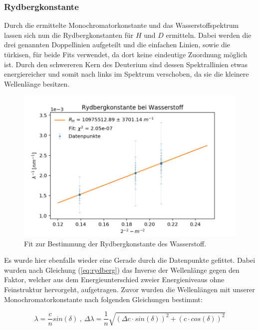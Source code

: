 \documentclass[]{article}
\begin{document}
\newpage

\subsubsection{Rydbergkonstante}
Durch die ermittelte Monochromatorkonstante und das Wasserstoffspektrum lassen sich nun die Rydbergkonstanten für $H$ und $D$ ermitteln. Dabei werden die drei genannten Doppellinien aufgeteilt und die einfachen Linien, sowie die türkisen, für beide Fits verwendet, da dort keine eindeutige Zuordnung möglich ist. Durch den schwereren Kern des Deuterium sind dessen Spektrallinien etwas energiereicher und somit nach links im Spektrum verschoben, da sie die kleinere Wellenlänge besitzen. 

\begin{figure}[H]
\centering
\includegraphics[width=1\textwidth]{Plots/R_H.png}
\caption{ Fit zur Bestimmung der Rydbergkonstante des Wasserstoff.}
\label{fig:Rydberg H}
\end{figure}

Es wurde hier ebenfalls wieder eine Gerade durch die Datenpunkte gefittet. Dabei wurden nach Gleichung (\ref{eq:rydberg}) das Inverse der Wellenlänge gegen den Faktor, welcher aus dem Energieunterschied zweier Energieniveaus ohne Feinstruktur hervorgeht, aufgetragen. Zuvor wurden die Wellenlängen mit unserer Monochromatorkonstante nach folgenden Gleichungen bestimmt:

\begin{equation}
\lambda = \frac{c}{n} sin(\delta) \:,\: \Delta\lambda = \frac{1}{n} \sqrt{(\Delta c \cdot sin(\delta))^2 + (c\cdot cos(\delta) )^2}
\end{equation}
\end{document}
